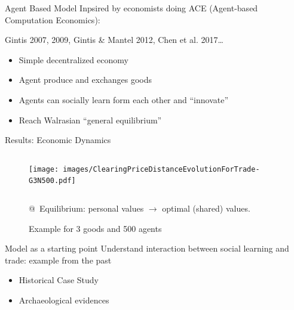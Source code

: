 \documentclass[12pt, notes=show]{beamer}
\begin{document}
\begin{frame}{Agent Based Model}
    Inpsired by economists doing ACE (Agent-based Computation Economics):
    \begin{center}
	Gintis 2007, 2009, Gintis \& Mantel 2012, Chen et al. 2017\dots 
    \end{center}
    
    \begin{itemize}
	\item Simple decentralized economy
	\item Agent produce and exchanges goods
	\item Agents can socially learn form each other and ``innovate''
	\item Reach Walrasian ``general equilibrium''
    \end{itemize}
\end{frame}


\begin{frame}{Results: Economic Dynamics}
	\begin{figure}
	    \caption{Example for 3 goods and 500 agents}
	    \begin{columns}
		\texttt{[image: images/ClearingPriceDistanceEvolutionForTrade-G3N500.pdf]}\\
	    \end{columns}
		@~Equilibrium: personal values  $\rightarrow$ optimal (shared) values.
	\end{figure}
	
\end{frame}



\begin{frame}{Model as a starting point}
 Understand interaction between social learning and trade: example from the past
 \vfil
 \begin{itemize}
     \item Historical Case Study
 \vfil
     \item Archaeological evidences
 \end{itemize}

    
\end{frame}
\end{document}
